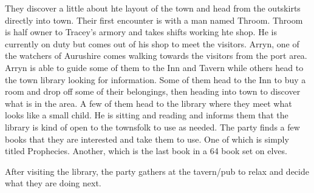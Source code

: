 They discover a little about hte layout of the town and head from the outskirts directly into town. Their first encounter is with a man named Throom. Throom is half owner to Tracey's armory and takes shifts working hte shop. He is currently on duty but comes out of his shop to meet the visitors. Arryn, one of the watchers of Aurushire comes walking towards the visitors from the port area. Arryn is able to guide some of them to the Inn and Tavern while others head to the town library looking for information. Some of them head to the Inn to buy a room and drop off some of their belongings, then heading into town to discover what is in the area. A few of them head to the library where they meet what looks like a small child. He is sitting and reading and informs them that the library is kind of open to the townsfolk to use as needed. The party finds a few books that they are interested and take them to use. One of which is simply titled Prophecies. Another, which is the last book in a 64 book set on elves.

After visiting the library, the party gathers at the tavern/pub to relax and decide what they are doing next. 
